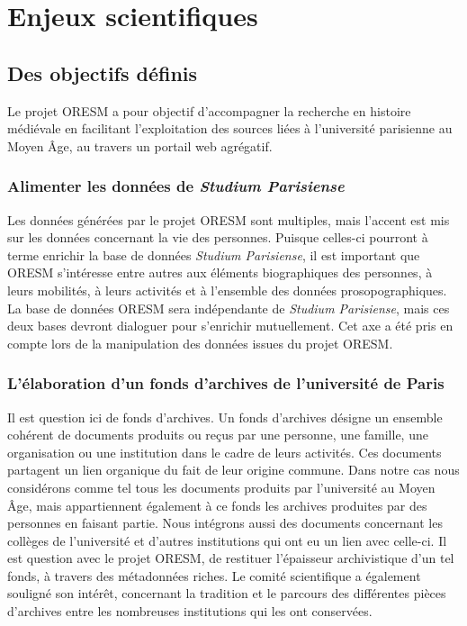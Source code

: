 \chapter{Enjeux scientifiques}
\section{Des objectifs définis}
Le projet ORESM a pour objectif d’accompagner la recherche en histoire médiévale en facilitant l’exploitation des sources liées à l’université parisienne au Moyen Âge, au travers un portail web agrégatif. 
\subsection{Alimenter les données de \textit{Studium Parisiense}}
Les données générées par le projet ORESM sont multiples, mais l'accent est mis sur les données concernant la vie des personnes. Puisque celles-ci pourront à terme enrichir la base de données \textit{Studium Parisiense}, il est important que ORESM s'intéresse entre autres aux éléments biographiques des personnes, à leurs mobilités, à leurs activités et à l'ensemble des données prosopographiques. La base de données ORESM sera indépendante de \textit{Studium Parisiense}, mais ces deux bases devront dialoguer pour s'enrichir mutuellement. Cet axe a été pris en compte lors de la manipulation des données issues du projet ORESM.
\subsection{L'élaboration d'un fonds d'archives de l'université de Paris}
Il est question ici de fonds d’archives. Un fonds d'archives désigne un ensemble cohérent de documents produits ou reçus par une personne, une famille, une organisation ou une institution dans le cadre de leurs activités. Ces documents partagent un lien organique du fait de leur origine commune. Dans notre cas nous considérons comme tel tous les documents produits par l’université au Moyen Âge, mais appartiennent également à ce fonds les archives produites par des personnes en faisant partie. Nous intégrons aussi des documents concernant les collèges de l’université et d’autres institutions qui ont eu un lien avec celle-ci. Il est question avec le projet ORESM, de restituer l'épaisseur archivistique d'un tel fonds, à travers des métadonnées riches. Le comité scientifique a également souligné son intérêt, concernant la tradition et le parcours des différentes pièces d'archives entre les nombreuses institutions qui les ont conservées.
